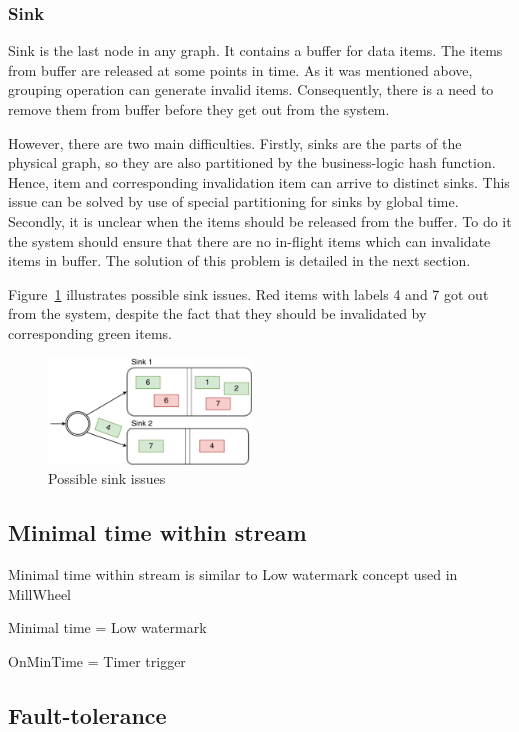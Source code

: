 \subsubsection{Sink}
Sink is the last node in any graph. It contains a buffer for data items. The items from buffer are released at some points in time. As it was mentioned above, grouping operation can generate invalid items. Consequently, there is a need to remove them from buffer before they get out from the system.  

However, there are two main difficulties. Firstly, sinks are the parts of the physical graph, so they are also partitioned by the business-logic hash function. Hence, item and corresponding invalidation item can arrive to distinct sinks. This issue can be solved by use of special partitioning for sinks by global time. Secondly, it is unclear when the items should be released from the buffer. To do it the system should ensure that there are no in-flight items which can invalidate items in buffer. The solution of this problem is detailed in the next section. 

Figure~\ref{invalidation-problems-figure} illustrates possible sink issues. Red items with labels 4 and 7 got out from the system, despite the fact that they should be invalidated by corresponding green items. 

\begin{figure}[htbp]
  \centering
  \includegraphics[width=0.48\textwidth]{pics/invalidation_problems}
  \caption{Possible sink issues}
  \label {invalidation-problems-figure}
\end{figure}

\subsection{Minimal time within stream}
Minimal time within stream is similar to Low watermark concept used in MillWheel~\cite{Akidau:2013:MFS:2536222.2536229}

Minimal time = Low watermark

OnMinTime = Timer trigger

\subsection{Fault-tolerance}

